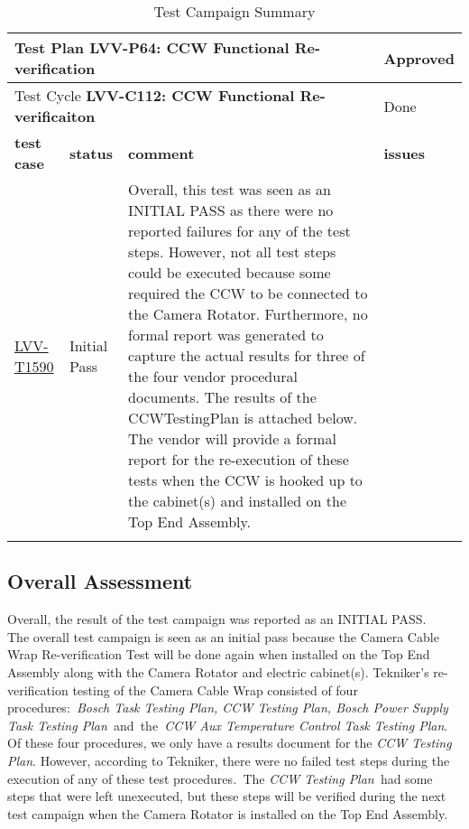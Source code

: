 \documentclass[SE,lsstdraft,STR,toc]{lsstdoc}
\begin{document}
\begin{longtable}{p{2cm}p{2.5cm}p{9cm}p{2.5cm}}
\toprule
\multicolumn{3}{l}{ Test Plan {\bf LVV-P64:  CCW Functional Re-verification
 }} & Approved \\\hline

  \multicolumn{3}{l}{ Test Cycle {\bf LVV-C112:  CCW Functional Re-verificaiton
 }} & Done \\\hline

  {\bf \footnotesize test case} & {\bf \footnotesize status} & {\bf \footnotesize comment} & {\bf \footnotesize issues} \\\toprule

    \href{https://jira.lsstcorp.org/secure/Tests.jspa#/testCase/LVV-T1590}{LVV-T1590}
    & Initial Pass &
    \begin{minipage}[]{9cm}
    \smallskip
     Overall, this test was seen as an INITIAL PASS as there were no reported
failures for any of the test steps. However, not all test steps could be
executed because some required the CCW to be connected to the Camera
Rotator. Furthermore, no formal report was generated to capture the
actual results for three of the four vendor procedural documents. The
results of the CCWTestingPlan is attached below. The vendor will provide
a formal report for the re-execution of these tests when the CCW is
hooked up to the cabinet(s) and installed on the Top End Assembly.~

    \medskip
    \end{minipage}
    &
    \\\hline
\caption{Test Campaign Summary}
\label{table:summary}
\end{longtable}

\subsection{Overall Assessment}
\label{sect:overallassessment}

 Overall, the result of the test campaign was reported as an INITIAL
PASS.\\[2\baselineskip]The overall test campaign is seen as an initial
pass because the Camera Cable Wrap Re-verification Test will be done
again when installed on the Top End Assembly along with the Camera
Rotator and electric cabinet(s). Tekniker's re-verification testing of
the Camera Cable Wrap consisted of four procedures:\emph{~Bosch Task
Testing Plan, CCW Testing Plan, Bosch Power Supply Task Testing
Plan~}and\emph{~}the\emph{~CCW Aux Temperature Control Task Testing
Plan}. Of these four procedures, we only have a results document for the
\emph{CCW Testing Plan}. However, according to Tekniker, there were no
failed test steps during the execution of any of these test
procedures\emph{.~}The \emph{CCW Testing Plan~}had some steps that were
left unexecuted, but these steps will be verified during the next test
campaign when the Camera Rotator is installed on the Top End Assembly.
\end{document}
